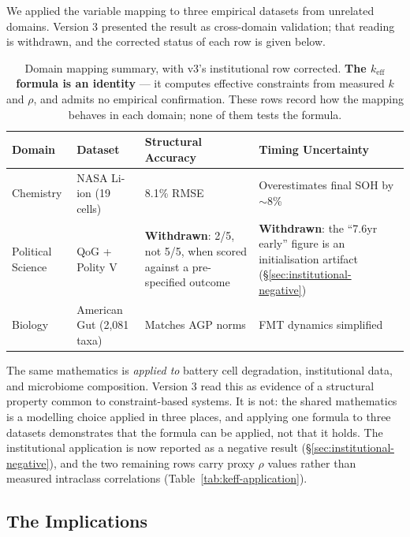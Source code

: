 \documentclass[11pt,a4paper]{article}
\theoremstyle{definition}
\theoremstyle{remark}
\newcommand{\keff}{k_{\text{eff}}}
\begin{document}
We applied the variable mapping to three empirical datasets from unrelated domains. Version 3 presented the result as cross-domain validation; that reading is withdrawn, and the corrected status of each row is given below.

\begin{table}[H]
\centering
\small
\begin{tabular}{>{\raggedright}p{} >{\raggedright}p{} >{\raggedright}p{} >{\raggedright\arraybackslash}p{}}
\toprule
\textbf{Domain} & \textbf{Dataset} & \textbf{Structural Accuracy} & \textbf{Timing Uncertainty} \\
\midrule
Chemistry & NASA Li-ion (19 cells) & 8.1\% RMSE & Overestimates final SOH by $\sim$8\% \\
Political Science & QoG + Polity V & \textbf{Withdrawn}: 2/5, not 5/5, when scored against a pre-specified outcome & \textbf{Withdrawn}: the ``7.6yr early'' figure is an initialisation artifact (\S\ref{sec:institutional-negative}) \\
Biology & American Gut (2,081 taxa) & Matches AGP norms & FMT dynamics simplified \\
\bottomrule
\end{tabular}
\caption{Domain mapping summary, with v3's institutional row corrected. \textbf{The $\keff$ formula is an identity} --- it computes effective constraints from measured $k$ and $\rho$, and admits no empirical confirmation. These rows record how the mapping behaves in each domain; none of them tests the formula.}
\end{table}

The same mathematics is \emph{applied to} battery cell degradation, institutional data, and microbiome composition. Version 3 read this as evidence of a structural property common to constraint-based systems. It is not: the shared mathematics is a modelling choice applied in three places, and applying one formula to three datasets demonstrates that the formula can be applied, not that it holds. The institutional application is now reported as a negative result (\S\ref{sec:institutional-negative}), and the two remaining rows carry proxy $\rho$ values rather than measured intraclass correlations (Table~\ref{tab:keff-application}).

\subsection{The Implications}
\end{document}
